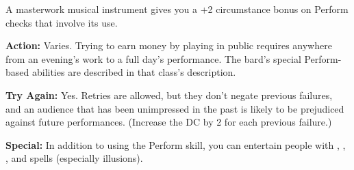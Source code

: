 A masterwork musical instrument gives you a +2 circumstance bonus on Perform checks that involve its use.

\textbf{Action:} Varies. Trying to earn money by playing in public requires anywhere from an evening's work to a full day's performance. The bard's special Perform-based abilities are described in that class's description.

\textbf{Try Again:} Yes. Retries are allowed, but they don't negate previous failures, and an audience that has been unimpressed in the past is likely to be prejudiced against future performances. (Increase the DC by 2 for each previous failure.)

\textbf{Special:} In addition to using the Perform skill, you can entertain people with , , , and spells (especially illusions).
